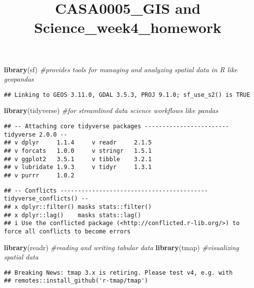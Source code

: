 \documentclass[
]{article}
\title{CASA0005\_GIS and Science\_week4\_homework}
\author{}
\date{\vspace{-2.5em}}
\newenvironment{Shaded}{\begin{snugshade}}{\end{snugshade}}
\newcommand{\CommentTok}[1]{\textcolor[rgb]{0.56,0.35,0.01}{\textit{#1}}}
\newcommand{\FunctionTok}[1]{\textcolor[rgb]{0.13,0.29,0.53}{\textbf{#1}}}
\newcommand{\NormalTok}[1]{#1}
\begin{document}
\maketitle

\begin{Shaded}
\begin{Highlighting}[]
\FunctionTok{library}\NormalTok{(sf) }\CommentTok{\#provides tools for managing and analyzing spatial data in R like geopandas}
\end{Highlighting}
\end{Shaded}

\begin{verbatim}
## Linking to GEOS 3.11.0, GDAL 3.5.3, PROJ 9.1.0; sf_use_s2() is TRUE
\end{verbatim}

\begin{Shaded}
\begin{Highlighting}[]
\FunctionTok{library}\NormalTok{(tidyverse) }\CommentTok{\#for streamlined data science workflows like pandas}
\end{Highlighting}
\end{Shaded}

\begin{verbatim}
## -- Attaching core tidyverse packages ------------------------ tidyverse 2.0.0 --
## v dplyr     1.1.4     v readr     2.1.5
## v forcats   1.0.0     v stringr   1.5.1
## v ggplot2   3.5.1     v tibble    3.2.1
## v lubridate 1.9.3     v tidyr     1.3.1
## v purrr     1.0.2
\end{verbatim}

\begin{verbatim}
## -- Conflicts ------------------------------------------ tidyverse_conflicts() --
## x dplyr::filter() masks stats::filter()
## x dplyr::lag()    masks stats::lag()
## i Use the conflicted package (<http://conflicted.r-lib.org/>) to force all conflicts to become errors
\end{verbatim}

\begin{Shaded}
\begin{Highlighting}[]
\FunctionTok{library}\NormalTok{(readr) }\CommentTok{\#reading and writing tabular data}
\FunctionTok{library}\NormalTok{(tmap) }\CommentTok{\#visualizing spatial data}
\end{Highlighting}
\end{Shaded}

\begin{verbatim}
## Breaking News: tmap 3.x is retiring. Please test v4, e.g. with
## remotes::install_github('r-tmap/tmap')
\end{verbatim}
\end{document}
